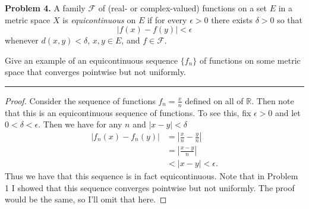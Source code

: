 \documentclass[leqno]{article}
\theoremstyle{nonumberplain}
\newtheorem{proof}{Proof}
\newcommand{\R}{\mathbb{R}}
\begin{document}
\pagebreak





\noindent\textbf{Problem 4.} A family $\mathcal{F}$ of (real- or complex-valued) functions on a set $E$ in a metric space $X$ is \emph{equicontinuous} on $E$ if for every $\epsilon>0$ there exists $\delta>0$ so that
\[
|f(x)-f(y)|<\epsilon
\]
whenever $d(x,y)<\delta$, $x,y\in E$, and $f\in \mathcal{F}$.

\noindent Give an example of an equicontinuous sequence $\{f_n\}$ of functions on some metric space that converges pointwise but not uniformly.

\noindent\rule[0.5ex]{\linewidth}{1pt}

\begin{proof}
Consider the sequence of functions $f_n = \frac{x}{n}$ defined on all of $\R$. Then note that this is an equicontinuous sequence of functions.  To see this, fix $\epsilon>0$ and let $0<\delta<\epsilon$.  Then we have for any $n$ and $|x-y|<\delta$
\begin{align*}
|f_n(x)-f_n(y)|&=\left| \frac{x}{n}-\frac{y}{n} \right|\\
&= \left| \frac{x-y}{n} \right|\\
&< |x-y|<\epsilon.
\end{align*}
Thus we have that this sequence is in fact equicontinuous.  Note that in Problem 1 I showed that this sequence converges pointwise but not uniformly.  The proof would be the same, so I'll omit that here.
\end{proof}


\pagebreak
\end{document}
